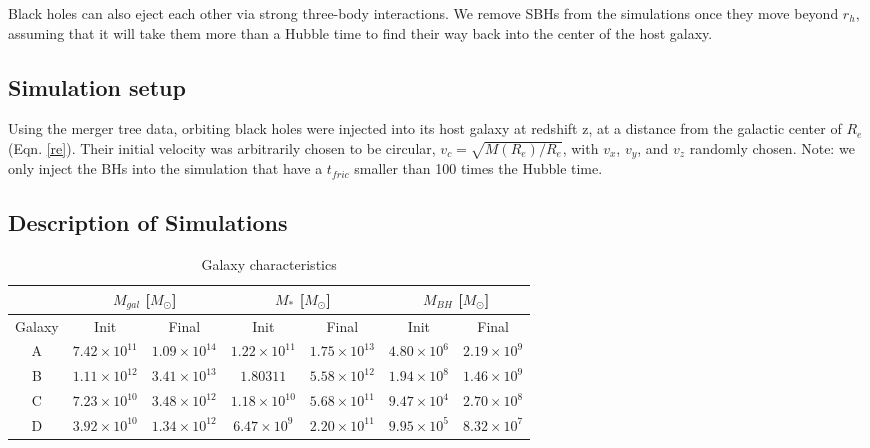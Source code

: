 \documentclass[english, apj]{emulateapj}
\begin{document}
Black holes can also eject each other via strong three-body interactions. We remove SBHs from the simulations once they move beyond $r_h$, assuming that it will take them more than a Hubble time to find their way back into the center of the host galaxy.

\subsection{Simulation setup}
Using the merger tree data, orbiting black holes were injected into its host galaxy at redshift z, at a distance from the galactic center of $R_{e}$ (Eqn. \ref{re}).  Their initial velocity was arbitrarily chosen to be circular, $v_c = \sqrt{M(R_e)/R_e}$, with $v_x$, $v_y$, and $v_z$ randomly chosen.  Note: we only inject the BHs into the simulation that have a $t_{fric}$ smaller than 100 times the Hubble time.


\subsection{Description of Simulations}
\begin{table}
\centering
\caption{Galaxy characteristics}
\begin{tabular}{c| c c| c c| c c}
 & \multicolumn{2}{c}{$M_{gal}$ [$M_{\odot}$]} & 
\multicolumn{2}{c}{$M_{*}$ [$M_{\odot}$]} & 
\multicolumn{2}{c}{$M_{BH}$ [$M_{\odot}$]} \\
\hline
Galaxy & Init & Final & Init & Final & Init & Final \\
 \hline
A & $7.42\times10^{11}$ & $1.09\times10^{14}$  & $1.22\times10^{11}$ & $1.75\times10^{13}$ & $4.80\times10^{6}$ & $2.19\times10^{9}$\\
B & $1.11\times10^{12}$ & $3.41\times10^{13}$ & $1.80\mathrm{3}{11}$ & $5.58\times10^{12}$ & $1.94\times10^{8}$ & $1.46\times10^{9}$\\
C & $7.23\times10^{10}$ & $3.48\times10^{12}$ & $1.18\times10^{10}$ & $5.68\times10^{11}$ & $9.47\times10^{4}$ & $2.70\times10^{8}$\\
D & $3.92\times10^{10}$ & $1.34\times10^{12}$ & $6.47\times10^{9}$ & $2.20\times10^{11}$ & $9.95\times10^{5}$ & $8.32\times10^{7}$\\
\end{tabular}
\end{table}
\end{document}
